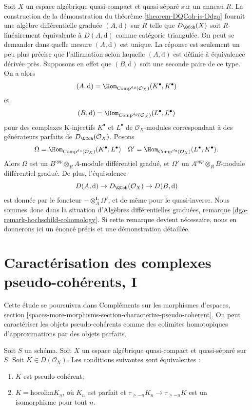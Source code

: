 \begin{remark}
\label{remark-independence-choice}
Soit $X$ un espace alg\'ebrique quasi-compact et quasi-s\'epar\'e sur un anneau
$R$. La construction de la d\'emonstration du th\'eor\`eme
\ref{theorem-DQCoh-is-Ddga} fournit une alg\`ebre diff\'erentielle gradu\'ee
$(A,\text{d})$ sur $R$ telle que $D_\QCoh(X)$ soit $R$-lin\'eairement
\'equivalente \`a $D(A,\text{d})$ comme cat\'egorie triangul\'ee. On peut se
demander dans quelle mesure $(A,\text{d})$ est unique. La r\'eponse est
seulement un peu plus pr\'ecise que l'affirmation selon laquelle
$(A,\text{d})$ est d\'efinie \`a \'equivalence d\'eriv\'ee pr\`es. Supposons en
effet que $(B,\text{d})$ soit une seconde paire de ce type. On a alors
$$
(A, \text{d}) = \Hom_{\text{Comp}^{dg}(\mathcal{O}_X)}(K^\bullet, K^\bullet)
$$
et
$$
(B, \text{d}) = \Hom_{\text{Comp}^{dg}(\mathcal{O}_X)}(L^\bullet, L^\bullet)
$$
pour des complexes K-injectifs $K^\bullet$ et $L^\bullet$ de
$\mathcal{O}_X$-modules correspondant \`a des g\'en\'erateurs parfaits de
$D_\QCoh(\mathcal{O}_X)$. Posons
$$
\Omega = \Hom_{\text{Comp}^{dg}(\mathcal{O}_X)}(K^\bullet, L^\bullet)
\quad
\Omega' = \Hom_{\text{Comp}^{dg}(\mathcal{O}_X)}(L^\bullet, K^\bullet).
$$
Alors $\Omega$ est un $B^{opp}\otimes_RA$-module diff\'erentiel gradu\'e, et
$\Omega'$ un $A^{opp}\otimes_RB$-module diff\'erentiel gradu\'e. De plus,
l'\'equivalence
$$
D(A, \text{d}) \to D_\QCoh(\mathcal{O}_X) \to
D(B, \text{d})
$$
est donn\'ee par le foncteur $-\otimes_A^\mathbf{L}\Omega'$, et de m\^eme pour
le quasi-inverse. Nous sommes donc dans la situation d'Alg\`ebres
diff\'erentielles gradu\'ees, remarque
\ref{dga-remark-hochschild-cohomology}. Si cette remarque devient n\'ecessaire,
nous en donnerons ici un \'enonc\'e pr\'ecis et une d\'emonstration d\'etaill\'ee.
\end{remark}

\section{Caract\'erisation des complexes pseudo-coh\'erents, I}
\label{section-pseudo-coherent-hocolim}

\noindent
Cette \'etude se poursuivra dans Compl\'ements sur les morphismes d'espaces,
section
\ref{spaces-more-morphisms-section-characterize-pseudo-coherent}.
On peut caract\'eriser les objets pseudo-coh\'erents
comme des colimites homotopiques d'approximations par des objets parfaits.

\begin{lemma}
\label{lemma-pseudo-coherent-hocolim}
Soit $S$ un sch\'ema.
Soit $X$ un espace alg\'ebrique quasi-compact et quasi-s\'epar\'e sur $S$.
Soit $K \in D(\mathcal{O}_X)$. Les conditions suivantes sont \'equivalentes :
\begin{enumerate}
\item $K$ est pseudo-coh\'erent;
\item $K = \text{hocolim} K_n$, o\`u
$K_n$ est parfait et $\tau_{\geq -n}K_n \to \tau_{\geq -n}K$
est un isomorphisme pour tout $n$.
\end{enumerate}
\end{lemma}

